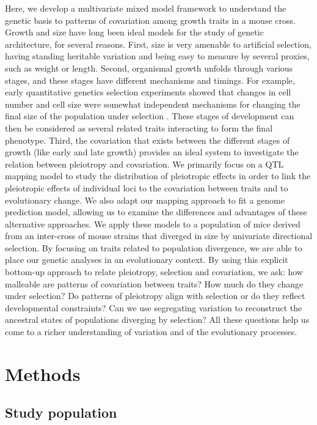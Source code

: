 \begin{refsection}
Here, we develop a multivariate mixed model framework to understand the
genetic basis to patterns of covariation among growth traits in a mouse cross.
Growth and size have long been ideal models for the study of genetic
architecture, for several reasons. First, size is very amenable to artificial
selection, having standing heritable variation and being easy to measure by
several proxies, such as weight or length. Second, organismal growth unfolds
through various stages, and these stages have different mechanisms and
timings. For example, early quantitative genetics selection experiments showed
that changes in cell number and cell size were somewhat independent mechanisms
for changing the final size of the population under selection
\parencite{Falconer1978-kq,Cheverud1983-fq,Leamy1984-df,Riska1984-ml}. These
stages of development can then be considered as several related traits
interacting to form the final phenotype. Third, the  covariation that exists
between the different stages of growth (like early and late growth) provides
an ideal system to investigate the relation between pleiotropy and
covariation. We primarily focus on a QTL mapping model to study the
distribution of pleiotropic effects in order to link the pleiotropic effects
of individual loci to the covariation between traits and to evolutionary
change. We also adapt our mapping approach to fit a genome prediction model,
allowing us to examine the differences and advantages of these alternative
approaches. We apply these models to a population of mice derived from an
inter-cross of mouse strains that diverged in size by univariate directional
selection. By focusing on traits related to population divergence, we are able
to place our genetic analyses in an evolutionary context. By using this
explicit bottom-up approach to relate pleiotropy, selection and covariation,
we ask: how malleable are patterns of covariation between traits? How much do
they change under selection? Do patterns of pleiotropy align with selection or
do they reflect developmental constraints? Can we use segregating variation to
reconstruct the ancestral states of populations diverging by selection? All
these questions help us come to a richer understanding of variation and of the
evolutionary processes.


\section{Methods}

\subsection{Study population}


\end{refsection}
